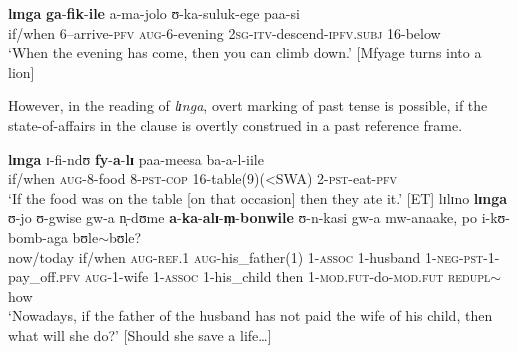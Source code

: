 \begin{exe}
\ex \gll \textbf{lɪnga} \textbf{ga}-\textbf{fik}-\textbf{ile} a-ma-jolo ʊ-ka-suluk-ege paa-si\\
if/when 6--arrive-\textsc{pfv} \textsc{aug}-6-evening \textsc{2sg}-\textsc{itv}-descend-\textsc{ipfv.subj} 16-below\\
\glt \lq When the evening has come, then you can climb down.' [Mfyage turns into a lion]
\end{exe}

However, in the  reading of \textit{lɪnga}, overt marking of past tense is possible, if the state-of-affairs in the  clause is overtly construed in a past reference frame.

\begin{exe}
\ex \gll \textbf{lɪnga} ɪ-fi-ndʊ \textbf{fy}-\textbf{a}-\textbf{lɪ} paa-meesa ba-a-l-iile\\
if/when \textsc{aug}-8-food 8-\textsc{pst}-\textsc{cop} 16-table(9)(<SWA) 2-\textsc{pst}-eat-\textsc{pfv}\\
\glt \lq If the food was on the table [on that occasion] then they ate it.' [ET]
\ex \gll lɪlɪno \textbf{lɪnga} ʊ-jo ʊ-gwise gw-a n̩-dʊme \textbf{a}-\textbf{ka}-\textbf{alɪ}-\textbf{m̩}-\textbf{bonwile} ʊ-n-kasi gw-a mw-anaake, po i-kʊ-bomb-aga bʊle$\sim$bʊle?\\
now/today if/when \textsc{aug}-\textsc{ref.1} \textsc{aug}-his\_father(1) 1-\textsc{assoc} 1-husband 1-\textsc{neg}-\textsc{pst}-1-pay\_off.\textsc{pfv} \textsc{aug}-1-wife 1-\textsc{assoc} 1-his\_child then 1-\textsc{mod.fut}-do-\textsc{mod.fut} \textsc{redupl}$\sim$how\\
\glt `Nowadays, if the father of the husband has not paid the wife of his child, then what will she do?' [Should she save a life\ldots]
\end{exe}

